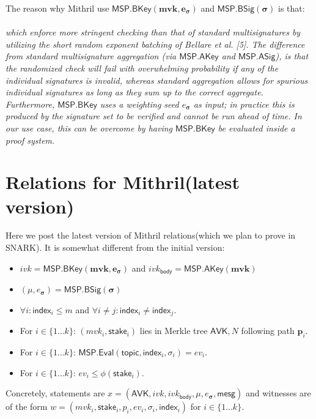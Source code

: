 \documentclass{article}
\begin{document}
The reason why Mithril use $\mathsf{MSP.BKey}(\textbf{mvk}, \bm{e_\sigma})$ and $\mathsf{MSP.BSig}(\bm{\sigma})$ is that:
\\
\\
\textit{which enforce more
stringent checking than that of standard multisignatures by utilizing the short random exponent batching of Bellare et al. [5]. The difference from standard multisignature aggregation (via $\mathsf{MSP.AKey}$ and $\mathsf{MSP.ASig}$), is that the randomized
check will fail with overwhelming probability if any of the individual signatures
is invalid, whereas standard aggregation allows for spurious individual signatures
as long as they sum up to the correct aggregate. Furthermore, $\mathsf{MSP.BKey}$ uses a
weighting seed $e_{\bm{\sigma}}$ as input; in practice this is produced by the signature set to be
verified and cannot be run ahead of time. In our use case, this can be overcome by having $\mathsf{MSP.BKey}$ be evaluated inside a proof system.}


\section{Relations for Mithril(latest version)}

Here we post the latest version of Mithril relations(which we plan to prove in SNARK). It is somewhat different from the initial version:

\begin{itemize}
    \item $ivk = \mathsf{MSP.BKey}(\textbf{mvk}, \bm{e_\sigma})$ and $ivk_{\mathsf{body}} = \mathsf{MSP.AKey}(\textbf{mvk})$ 
    \item $(\mu,e_{\bm{\sigma}}) = \mathsf{MSP.BSig}(\bm{\sigma})$
    \item $\forall i : \mathsf{index}_i \leq m$ and $\forall i \neq j : \mathsf{index}_i \neq \mathsf{index}_j$.\item For $i \in \{1 \dots k\}$: $(mvk_i, \mathsf{stake}_i)$ lies in Merkle tree $\mathsf{AVK}, N$ following path $\bm{p}_i$.
    \item For $i \in \{1 \dots k\}$: $\mathsf{MSP.Eval}(\mathsf{topic}, \mathsf{index}_i, \sigma_i) = ev_i$.
    \item For $i \in \{1 \dots k\}$: $ev_i \leq \phi(\mathsf{stake}_i)$.
\end{itemize}

Concretely, statements are $x = (\mathsf{AVK}, ivk, ivk_{\mathsf{body}}, \mu, e_{\bm{\sigma}}, \mathsf{mesg})$ and witnesses are of the form $w = (mvk_i, \mathsf{stake}_i, p_i, ev_i, \sigma_i, \mathsf{index}_i)$ for $i \in \{1 \dots k\}$. 
\end{document}
